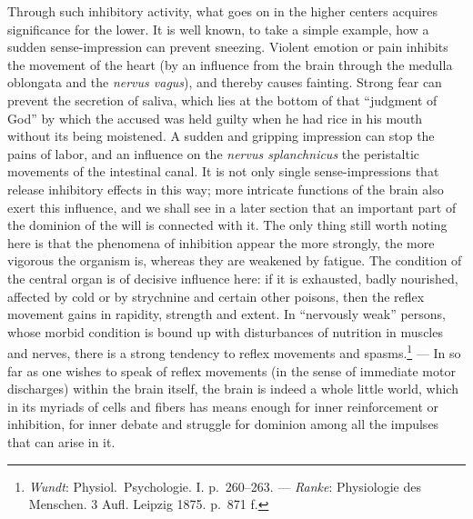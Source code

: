 \documentclass[12pt,a4paper]{book}
\begin{document}
Through such inhibitory activity, what goes on in the higher centers
acquires significance for the lower. It is well known, to take a simple
example, how a sudden sense-impression can prevent sneezing. Violent
emotion or pain inhibits the movement of the heart (by an influence from
the brain through the medulla oblongata and the \textit{nervus vagus}),
and thereby causes fainting. Strong fear can prevent the secretion of
saliva, which lies at the bottom of that ``judgment of God'' by which
the accused was held guilty when he had rice in his mouth without its
being moistened. A sudden and gripping impression can stop the pains of
labor, and an influence on the \textit{nervus splanchnicus} the
peristaltic movements of the intestinal canal. It is not only single
sense-impressions that release inhibitory effects in this way; more
intricate functions of the brain also exert this influence, and we shall
see in a later section that an important part of the dominion of the
will is connected with it. The only thing still worth noting here is
that the phenomena of inhibition appear the more strongly, the more
vigorous the organism is, whereas they are weakened by fatigue. The
condition of the central organ is of decisive influence here: if it is
exhausted, badly nourished, affected by cold or by strychnine and
certain other poisons, then the reflex movement gains in rapidity,
strength and extent. In ``nervously weak'' persons, whose morbid
condition is bound up with disturbances of nutrition in muscles and
nerves, there is a strong tendency to reflex movements and
spasms.\footnote{\emph{Wundt}: Physiol.\ Psychologie. I. p.~260--263.
--- \emph{Ranke}: Physiologie des Menschen. 3 Aufl. Leipzig 1875.
p.~871 f.} --- In so far as one wishes to speak of reflex movements (in
the sense of immediate motor discharges) within the brain itself, the
brain is indeed a whole little world, which in its myriads of cells and
fibers has means enough for inner reinforcement or inhibition, for inner
debate and struggle for dominion among all the impulses that can arise
in it.
\end{document}
